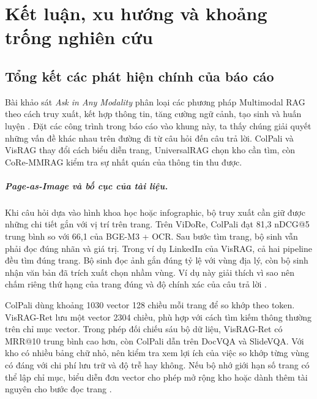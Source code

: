 
\chapter{Kết luận, xu hướng và khoảng trống nghiên cứu}
\label{chap:conclusion}

\section{Tổng kết các phát hiện chính của báo cáo}
\label{sec:conc_summary}

Bài khảo sát \textit{Ask in Any Modality} phân loại các phương pháp
Multimodal RAG theo cách truy xuất, kết hợp thông tin, tăng cường ngữ
cảnh, tạo sinh và huấn luyện \cite{abootorabi2025ask}. Đặt các công trình
trong báo cáo vào khung này, ta thấy chúng giải quyết những vấn đề khác
nhau trên đường đi từ câu hỏi đến câu trả lời. ColPali và VisRAG thay đổi
cách biểu diễn trang, UniversalRAG chọn kho cần tìm, còn CoRe-MMRAG kiểm
tra sự nhất quán của thông tin thu được.

\paragraph{Page-as-Image và bố cục của tài liệu.}
Khi câu hỏi dựa vào hình khoa học hoặc infographic, bộ truy xuất cần giữ
được những chi tiết gắn với vị trí trên trang. Trên ViDoRe, ColPali đạt
81,3 nDCG@5 trung bình so với 66,1 của BGE-M3 + OCR. Sau bước tìm trang,
bộ sinh vẫn phải đọc đúng nhãn và giá trị. Trong ví dụ LinkedIn của
VisRAG, cả hai pipeline đều tìm đúng trang. Bộ sinh đọc ảnh gắn đúng tỷ
lệ với vùng địa lý, còn bộ sinh nhận văn bản đã trích xuất chọn nhầm vùng.
Ví dụ này giải thích vì sao nên chấm riêng thứ hạng của trang đúng và độ
chính xác của câu trả lời \cite{faysse2025colpali,yu2025visrag}.

ColPali dùng khoảng 1030 vector 128 chiều mỗi trang để so khớp theo token.
VisRAG-Ret lưu một vector 2304 chiều, phù hợp với cách tìm kiếm thông
thường trên chỉ mục vector. Trong phép đối chiếu sáu bộ dữ liệu, VisRAG-Ret
có MRR@10 trung bình cao hơn, còn ColPali dẫn trên DocVQA và SlideVQA.
Với kho có nhiều bảng chữ nhỏ, nên kiểm tra xem lợi ích của việc so khớp
từng vùng có đáng với chi phí lưu trữ và độ trễ hay không. Nếu bộ nhớ giới
hạn số trang có thể lập chỉ mục, biểu diễn đơn vector cho phép mở rộng
kho hoặc dành thêm tài nguyên cho bước đọc trang
\cite{faysse2025colpali,yu2025visrag}.

